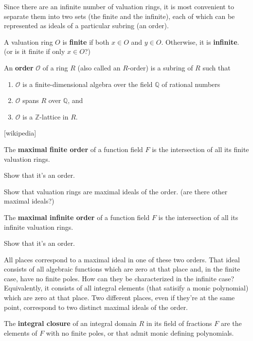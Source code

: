 Since there are an infinite number of valuation rings, it is most convenient to separate them
into two sets (the finite and the infinite), each of which can be represented as ideals
of a particular subring (an order).

\begin{definition}
A valuation ring $O$ is {\bf finite} if both $x \in O$ and $y \in O$.  Otherwise, it is {\bf infinite}.
(or is it finite if only $x \in O$?)
\end{definition}

\begin{definition}
An {\bf order} $\mathcal {O}$ of a ring $R$ (also called an $R$-order) is a subring of $R$ such that
\begin{enumerate}
\item $\mathcal {O}$ is a finite-dimensional algebra over the field $\mathbb {Q}$ of rational numbers
\item $\mathcal {O}$ spans $R$ over $\mathbb {Q}$, and
\item $\mathcal {O}$ is a $\mathbb {Z}$-lattice in $R$.
\end{enumerate}
[wikipedia]
\end{definition}

\begin{definition}
The {\bf maximal finite order} of a function field $F$ is the intersection of all its finite valuation rings.
\end{definition}

Show that it's an order.

Show that valuation rings are maximal ideals of the order.  (are there other maximal ideals?)

\begin{definition}
The {\bf maximal infinite order} of a function field $F$ is the intersection of all its infinite valuation rings.
\end{definition}

Show that it's an order.

All places correspond to a maximal ideal in one of these two orders.
That ideal consists of all algebraic functions which are zero at that place and,
in the finite case, have no finite poles.  How can they be characterized in the infinite case?
Equivalently, it consists of all integral elements (that satisify a monic polynomial) which are
zero at that place.
Two different places, even if they're at the same point, correspond to two distinct maximal ideals of the order.

\begin{definition}
The {\bf integral closure} of an integral domain $R$ in its field of fractions $F$
are the elements of $F$ with no finite poles, or that admit monic defining polynomials.
\end{definition}

